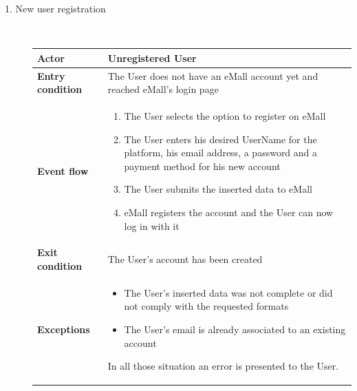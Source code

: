 \documentclass[11pt]{article}
\begin{document}
\begin{description}
    \item [1. New user registration] \hfill \\
    \begin{table}[H]
        \centering
        \setlength{\tabcolsep}{18pt}
        \renewcommand{\arraystretch}{1.4}
        \begin{tabularx}{\textwidth}{|>{\hsize=0.5\hsize}X|>{\hsize=1.5\hsize}X|}
            \hline
            \textbf{Actor} & Unregistered User \\
            \hline
            \textbf{Entry condition} & The User does not have an eMall account yet and reached eMall's login page \\
            \hline
            \textbf{Event flow} & 
                \begin{minipage}[t]{\hsize}
                \begin{enumerate}[topsep=0pt, leftmargin=*]
                    \item The User selects the option to register on eMall
                    \item The User enters his desired UserName for the platform, his email address, a password and a payment method for his new account
                    \item The User submits the inserted data to eMall
                    \item eMall registers the account and the User can now log in with it
                \end{enumerate}
                \end{minipage}
                \vspace{6pt}
            \\
            \hline
            \textbf{Exit condition} & The User's account has been created \\
            \hline
            \textbf{Exceptions} & 
                \begin{minipage}[t]{\hsize}
                \vspace{0pt}
                \begin{itemize}[topsep=0pt, leftmargin=*]
                    \item The User's inserted data was not complete or did not comply with the requested formats
                    \item The User's email is already associated to an existing account
                \end{itemize}
                \vspace{8pt}
                \end{minipage}
                In all those situation an error is presented to the User.
                \vspace{6pt}
            \\
            \hline
        \end{tabularx}
    \end{table}
    

\end{description}
\end{document}
